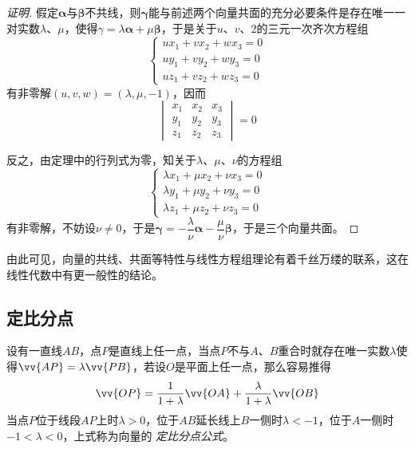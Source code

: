 \begin{proof}[证明]
假定$\bm{\alpha}$与$\bm{\beta}$不共线，则$\bm{\gamma}$能与前述两个向量共面的充分必要条件是存在唯一一对实数$\lambda$、$\mu$，使得$\gamma=\lambda \bm{\alpha} + \mu \bm{\beta}$，于是关于$u$、$v$、$2$的三元一次齐次方程组
\[
  \left\{
    \begin{array}{lll}
      u x_1 + v x_2 + w x_3 = 0  \\
      u y_1 + v y_2 + w y_3 = 0 \\
      u z_1 + v z_2 + w z_3 = 0
    \end{array}
    \right.
\]
有非零解$(u,v,w)=(\lambda, \mu, -1)$，因而
\[
  \begin{vmatrix}
    x_1 & x_2 & x_3\\
    y_1 & y_2 & y_3 \\
    z_1 & z_2 & z_3 
  \end{vmatrix}
  = 0
\]

反之，由定理中的行列式为零，知关于$\lambda$、$\mu$、$\nu$的方程组
\[
  \left\{
    \begin{array}{lll}
      \lambda x_1 + \mu x_2 + \nu x_3 = 0  \\
      \lambda y_1 + \mu y_2 + \nu y_3 = 0 \\
      \lambda z_1 + \mu z_2 + \nu z_3 = 0
    \end{array}
    \right.
\]
有非零解，不妨设$\nu \neq 0$，于是$\bm{\gamma} = -\dfrac{\lambda}{\nu} \bm{\alpha} - \dfrac{\mu}{\nu} \bm{\beta}$，于是三个向量共面。
\end{proof}

由此可见，向量的共线、共面等特性与线性方程组理论有着千丝万缕的联系，这在线性代数中有更一般性的结论。



\subsection{定比分点}
\label{sec:definition-proportion}

设有一直线$AB$，点$P$是直线上任一点，当点$P$不与$A$、$B$重合时就存在唯一实数$\lambda$使得$\vv{AP}=\lambda\vv{PB}$，若设$O$是平面上任一点，那么容易推得
\begin{equation}
  \label{eq:vector-definition-proportion}
  \vv{OP} = \frac{1}{1+\lambda} \vv{OA} + \frac{\lambda}{1+\lambda} \vv{OB}
\end{equation}
当点$P$位于线段$AP$上时$\lambda>0$，位于$AB$延长线上$B$一侧时$\lambda<-1$，位于$A$一侧时$-1<\lambda<0$，上式称为向量的 \emph{定比分点公式}。

